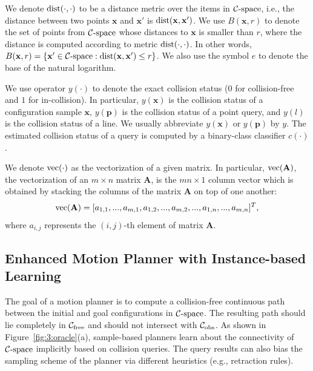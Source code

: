 We denote $\operatorname{dist}(\cdot, \cdot)$ to be a distance metric over the items in $\mathcal C\text{-space}$, i.e., the distance between two points $\mathbf x$ and $\mathbf x'$ is $\operatorname{dist}(\mathbf x, \mathbf x')$. We use $B(\mathbf x, r)$ to denote the set of points from $\mathcal C\text{-space}$ whose distances to $\mathbf x$ is smaller than $r$, where the distance is computed according to metric $\operatorname{dist}(\cdot, \cdot)$. In other words, $B(\mathbf x, r) = \{\mathbf x' \in \mathcal C\text{-space}: \operatorname{dist}(\mathbf x, \mathbf x') \leq r\}$. We also use the symbol $e$ to denote the base of the natural logarithm.

We use operator $y(\cdot)$ to denote the exact collision status ($0$ for collision-free and $1$ for in-collision). In particular, $y(\mathbf x)$ is the collision status of a configuration sample $\mathbf x$, $y(\mathbf p)$ is the collision status of a point query, and $y(l)$ is the collision status of a line. We usually abbreviate $y(\mathbf x)$ or $y(\mathbf p)$ by $y$. The estimated collision status of a query is computed by a binary-class classifier $c(\cdot)$.

We denote $\operatorname{vec}(\cdot)$ as the vectorization of a given matrix. In particular, $\operatorname{vec}(\mathbf A)$, the vectorization of an $m\times n$ matrix $\mathbf A$, is the $m n \times 1$ column vector which is obtained by stacking the columns of the matrix $\mathbf A$ on top of one another:
\begin{equation}
  \operatorname{vec}(\mathbf A) = [a_{1,1}, ..., a_{m,1}, a_{1,2}, ..., a_{m,2}, ..., a_{1,n}, ..., a_{m,n}]^T, \notag
\end{equation}
where $a_{i,j}$ represents the $(i,j)$-th element of matrix $\mathbf A$.


\subsection{Enhanced Motion Planner with Instance-based Learning}
The goal of a motion planner is to compute a collision-free continuous path between the initial and goal configurations in $\mathcal C\text{-space}$. The resulting path should lie completely in $\mathcal C_{\text{free}}$ and should not intersect with $\mathcal C_{\text{obs}}$. As shown in Figure~\ref{fig:3:oracle}(a), sample-based planners learn about the connectivity of $\mathcal C\text{-space}$ implicitly based on collision queries. The query results can also bias the sampling scheme of the planner via different heuristics (e.g., retraction rules).

